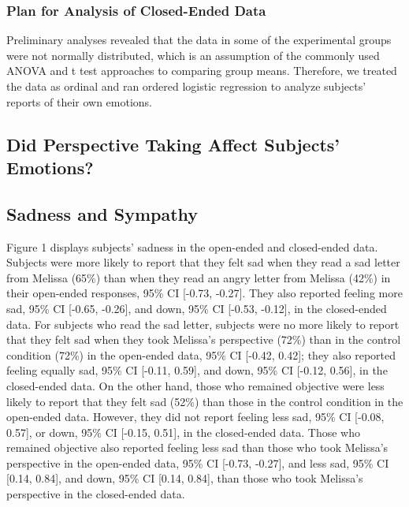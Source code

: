 \documentclass[man,a4paper,noextraspace,apacite]{apa6}\usepackage[]{graphicx}\usepackage[]{color}
\begin{document}
\subsubsection{Plan for Analysis of Closed-Ended Data} Preliminary analyses revealed that the data in some of the experimental groups were not normally distributed, which is an assumption of the commonly used ANOVA and t test approaches to comparing group means. Therefore, we treated the data as ordinal and ran ordered logistic regression to analyze subjects' reports of their own emotions.


\subsection{Did Perspective Taking Affect Subjects' Emotions?}

\subsection{Sadness and Sympathy} 


Figure 1 displays subjects' sadness in the open-ended and closed-ended data. 
    Subjects were more likely to report that they felt sad when they read a sad letter from Melissa (65\%) than when they read an angry letter from Melissa (42\%) in their open-ended responses, 95\% CI [-0.73, -0.27]. They also reported feeling more sad, 95\% CI [-0.65, -0.26], and down, 95\% CI [-0.53, -0.12], in the closed-ended data.
    For subjects who read the sad letter, subjects were no more likely to report that they felt sad when they took Melissa's perspective (72\%) than in the control condition (72\%) in the open-ended data, 95\% CI [-0.42, 0.42]; they also reported feeling equally sad, 95\% CI [-0.11, 0.59], and down, 95\% CI [-0.12, 0.56], in the closed-ended data. On the other hand, those who remained objective were less likely to report that they felt sad (52\%) than those in the control condition in the open-ended data. However, they did not report feeling less sad, 95\% CI [-0.08, 0.57], or down, 95\% CI [-0.15, 0.51], in the closed-ended data. Those who remained objective also reported feeling less sad than those who took Melissa's perspective in the open-ended data, 95\% CI [-0.73, -0.27], and less sad, 95\% CI [0.14, 0.84], and down, 95\% CI [0.14, 0.84], than those who took Melissa's perspective in the closed-ended data.
\end{document}
